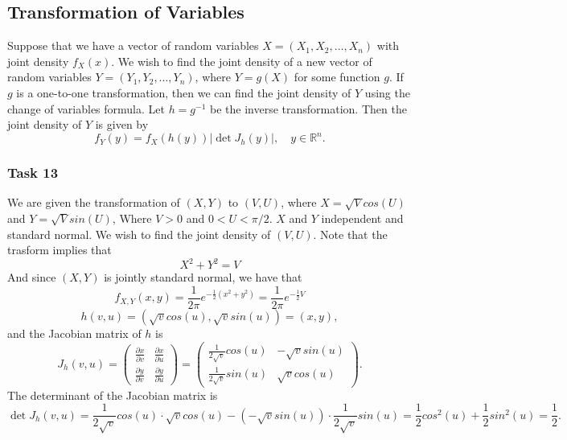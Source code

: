 \documentclass{article}
\theoremstyle{definition}
\theoremstyle{remark}
\begin{document}
\subsection{Transformation of Variables}
Suppose that we have a vector of random variables $X = (X_1, X_2, \ldots, X_n)$ with joint density $f_X(x)$. We wish to find the joint density of a new vector of random variables $Y = (Y_1, Y_2, \ldots, Y_n)$, where $Y = g(X)$ for some function $g$. If $g$ is a one-to-one transformation, then we can find the joint density of $Y$ using the change of variables formula. Let $h = g^{-1}$ be the inverse transformation. Then the joint density of $Y$ is given by
\begin{equation}
    f_Y(y) = f_X(h(y)) \left| \det J_h(y) \right|,
    \quad y \in \mathbb{R}^n.
\end{equation}
\subsubsection{Task 13}
We are given the transformation of $(X,Y)$ to $(V,U)$, where $X = \sqrt{V}cos(U)$ and $Y = \sqrt{V}sin(U)$, Where $ V > 0$ and $0 < U < \pi/2$. $X$ and $Y$ independent and standard normal. We wish to find the joint density of $(V,U)$. Note that the trasform implies that
$$X^2 + Y^2 = V$$
And since $(X,Y)$ is jointly standard normal, we have that
$$f_{X,Y}(x,y) = \frac{1}{2\pi} e^{-\frac{1}{2}(x^2 + y^2)} = \frac{1}{2\pi} e^{-\frac{1}{2}V}$$
\begin{equation}
    h(v,u) = (\sqrt{v}cos(u), \sqrt{v}sin(u)) = (x,y),
\end{equation}
and the Jacobian matrix of $h$ is
\begin{equation}
    J_h(v,u) = \begin{pmatrix}
        \frac{\partial x}{\partial v} & \frac{\partial x}{\partial u} \\
        \frac{\partial y}{\partial v} & \frac{\partial y}{\partial u}
    \end{pmatrix} = \begin{pmatrix}
        \frac{1}{2\sqrt{v}}cos(u) & -\sqrt{v}sin(u) \\
        \frac{1}{2\sqrt{v}}sin(u) & \sqrt{v}cos(u)
    \end{pmatrix}.
\end{equation}
The determinant of the Jacobian matrix is
\begin{equation}
    \det J_h(v,u) = \frac{1}{2\sqrt{v}}cos(u) \cdot \sqrt{v}cos(u) - (-\sqrt{v}sin(u)) \cdot \frac{1}{2\sqrt{v}}sin(u) = \frac{1}{2}cos^2(u) + \frac{1}{2}sin^2(u) = \frac{1}{2}.
\end{equation}
\end{document}
